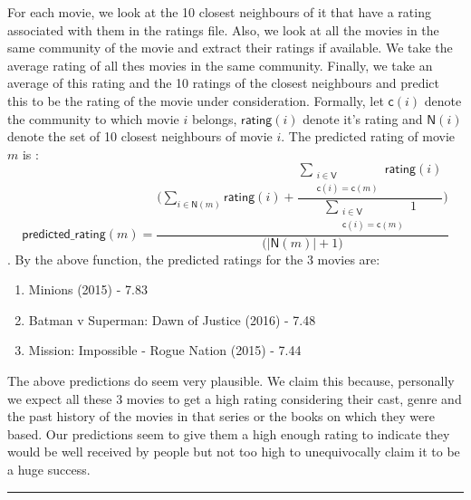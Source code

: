 \documentclass{article}
\newcommand{\V}{\mathsf{V}}
\newcommand{\neig}{\mathsf{N}}
\newcommand{\rat}{\mathsf{rating}}
\newcommand{\com}{\mathsf{c}}
\newcommand{\predrat}{\mathsf{predicted\_rating}}
\begin{document}
For each movie, we look at the 10 closest neighbours of it that have a rating associated with them in the ratings file.
Also, we look at all the movies in the same community of the movie and extract their ratings if available. We take the 
average rating of all thes movies in the same community.
Finally, we take 
an average of this rating and the 10 ratings of the closest neighbours
and predict this to be the rating of the movie under consideration. 
Formally, let $\com(i)$ denote the community to which movie $i$ belongs, 
$\rat(i)$ denote it's rating and $\neig(i)$ denote the set of 10 closest neighbours of movie $i$. The 
predicted rating of movie $m$ is :\\
$$ \predrat(m) = \frac{\Big(\sum\limits_{i \in \neig(m)}\rat(i) + 
  \dfrac{\sum\limits_{\substack{i \in \V \\ \com(i) = \com(m)}}\rat(i)}
  {\sum\limits_{\substack{i \in \V \\ \com(i) = \com(m)}}1}
  \Big)}
  {        \Big( |\neig(m)|+ 1 \Big)      
  }
  $$.
By the above function, the predicted ratings for the 3 movies are:\\
\begin{enumerate}
 \item 
 Minions (2015) - 7.83
 \item
 Batman v Superman: Dawn of Justice (2016) - 7.48
 \item
 Mission: Impossible - Rogue Nation (2015) - 7.44
 
\end{enumerate}

The above predictions do seem very plausible. We claim this because, personally we expect all these 3 movies
to get a high rating considering their cast, genre and the past history of the movies in that series or the books on which
they were based. Our predictions seem to give them a high enough rating to indicate they would be well received by people 
but not too high to unequivocally claim it to be a huge success.\\

\hrule
\end{document}
